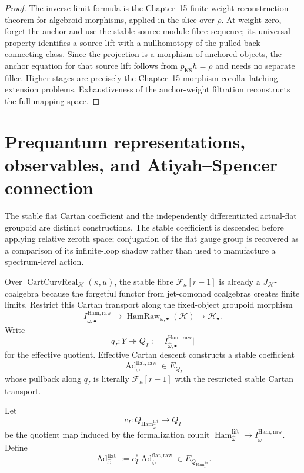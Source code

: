 \begin{proof}
The inverse-limit formula is the Chapter~15 finite-weight reconstruction theorem
for algebroid morphisms, applied in the slice over $\rho$.  At weight zero,
forget the anchor and use the stable source-module fibre sequence; its universal
property identifies a source lift with a nullhomotopy of the pulled-back
connecting class.  Since the projection is a morphism of anchored objects, the
anchor equation for that source lift follows from $p_{\mathrm{KS}}h=\rho$ and
needs no separate filler.  Higher stages are precisely the Chapter~15 morphism
corolla--latching extension problems.  Exhaustiveness of the anchor-weight
filtration reconstructs the full mapping space.
\end{proof}

\section{Prequantum representations, observables, and Atiyah--Spencer connection}
\label{sec:prequantum-local-observables}

The stable flat Cartan coefficient and the independently differentiated actual-flat
groupoid are distinct constructions.  The stable coefficient is descended before
applying relative zeroth space; conjugation of the flat gauge group is recovered
as a comparison of its infinite-loop shadow rather than used to manufacture a
spectrum-level action.

\begin{construction}
\label{constr:prequantum-conjugation-cartan-representation}
Over $\operatorname{CartCurvReal}_{\mathcal H}(\kappa,u)$, the stable fibre
$\mathscr F_\kappa[r-1]$ is already a $J_{\mathcal H}$-coalgebra because the
forgetful functor from jet-comonad coalgebras creates finite limits.  Restrict
this Cartan transport along the fixed-object groupoid morphism
\[
I^{\mathrm{Ham,raw}}_{\widehat\omega,\bullet}
\longrightarrow
\operatorname{HamRaw}_{\omega,\bullet}(\mathcal H)
\longrightarrow
\mathcal H_\bullet.
\]
Write
\[
q_I:Y\twoheadrightarrow Q_I
:=
\bigl|I^{\mathrm{Ham,raw}}_{\widehat\omega,\bullet}\bigr|
\]
for the effective quotient.  Effective Cartan descent constructs a stable
coefficient
\[
\boxed{
\operatorname{Ad}^{\mathrm{flat,raw}}_{\widehat\omega}
\in E_{Q_I}
}
\]
whose pullback along $q_I$ is literally $\mathscr F_\kappa[r-1]$ with the
restricted stable Cartan transport.

Let
\[
c_I:
Q_{\operatorname{Ham}^{\mathrm{lift}}_{\widehat\omega}}
\longrightarrow Q_I
\]
be the quotient map induced by the formalization counit
$\operatorname{Ham}^{\mathrm{lift}}_{\widehat\omega}\to
I^{\mathrm{Ham,raw}}_{\widehat\omega}$.  Define
\[
\boxed{
\operatorname{Ad}^{\mathrm{flat}}_{\widehat\omega}
:=
c_I^*\operatorname{Ad}^{\mathrm{flat,raw}}_{\widehat\omega}
\in E_{Q_{\operatorname{Ham}^{\mathrm{lift}}_{\widehat\omega}}}.
}
\]
\end{construction}

